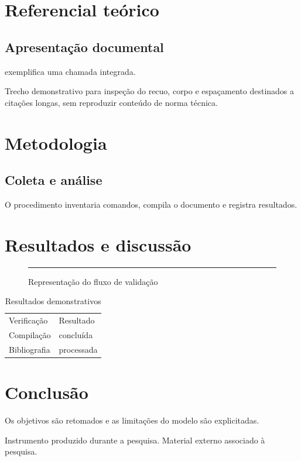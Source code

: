 \documentclass[12pt]{report}
\begin{document}
\chapter{Referencial teórico}
\section{Apresentação documental}
\textcite{associacao2025} exemplifica uma chamada integrada.
\begin{ABNTEXcitacaolonga}
Trecho demonstrativo para inspeção do recuo, corpo e espaçamento destinados
a citações longas, sem reproduzir conteúdo de norma técnica.
\end{ABNTEXcitacaolonga}

\chapter{Metodologia}
\section{Coleta e análise}
O procedimento inventaria comandos, compila o documento e registra resultados.

\chapter{Resultados e discussão}
\begin{figure}[ht]
  \centering
  \rule{0.55\linewidth}{2cm}
  \caption{Representação do fluxo de validação}
\end{figure}
\begin{table}[ht]
  \centering
  \caption{Resultados demonstrativos}
  \begin{tabular}{ll}
    Verificação & Resultado\\
    Compilação & concluída\\
    Bibliografia & processada
  \end{tabular}
\end{table}

\chapter{Conclusão}
Os objetivos são retomados e as limitações do modelo são explicitadas.

\ABNTEXacademicopostextual
\ABNTEXbibliografia
\ABNTEXglossario
{}
Instrumento produzido durante a pesquisa.
Material externo associado à pesquisa.
\end{document}
